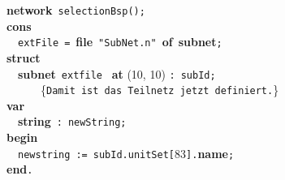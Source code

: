 {\bf network}~\verb&selectionBsp&\verb&(&\verb&)&\verb&;&\\[.15cm]
{\bf cons}\\
~~\verb&extFile&~\verb&=&~{\bf file}~\verb&"SubNet.n"&~{\bf of}~{\bf subnet}\verb&;&\\[.15cm]
{\bf struct}\\
~~{\bf subnet}~\verb&extfile&~ {\bf at} (10, 10) \verb&:&~\verb&subId&\verb&;&\\
~~~~~~{\small \{\verb{Damit ist das Teilnetz jetzt definiert.{\}}\\[.15cm]
{\bf var}\\
~~{\bf string}~\verb&:&~\verb&newString&\verb&;&\\[.15cm]
{\bf begin}\\
~~\verb&newstring&~\verb&:=&~\verb&subId&\verb&.&\verb&unitSet&\verb&[&83\verb&]&\verb&.&{\bf name}\verb&;&\\
{\bf end}\verb&.&\\ 
